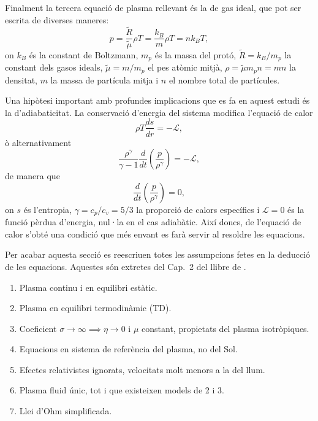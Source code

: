 Finalment la tercera equació de plasma rellevant és la de gas ideal, que pot ser escrita de diverses maneres:
\begin{equation}
	p = \frac{\tilde{R}}{\tilde{\mu}} \rho T = \frac{k_B}{m} \rho T = n k_B T, \tag{2.11} \label{eq.2.11}
\end{equation}
on $k_B$ és la constant de Boltzmann, $m_p$ és la massa del protó, $\tilde{R} = k_B/m_p$ la constant dels gasos ideals, $\tilde{\mu} = m/m_p$ el pes atòmic
mitjà, $\rho = \tilde{\mu} m_p n = m n$ la densitat, $m$ la massa de partícula mitja i $n$ el nombre total de partícules.


Una hipòtesi important amb profundes implicacions que es fa en aquest estudi és la d'adiabaticitat. La conservació d'energia del sistema modifica l'equació de calor
\begin{equation}
	\rho T \frac{ds}{dr} = - \mathcal{L}, \tag{2.12} \label{eq.2.12}
\end{equation}
ò alternativament
\begin{equation}
	\frac{\rho^\gamma}{\gamma - 1} \frac{d}{dt} \left( \frac{p}{\rho^\gamma} \right) = - \mathcal{L}, \tag{2.13} \label{eq.2.13}
\end{equation}
de manera que
\begin{equation}
	\frac{d}{dt} \left( \frac{p}{\rho^\gamma} \right) = 0, \tag{2.14} \label{eq.2.14}
\end{equation}
on $s$ és l'entropia, $\gamma = c_p/c_v = 5/3$ la proporció de calors específics i $\mathcal{L}=0$ és la funció pèrdua d'energia, nul·la en el cas adiabàtic.
Així doncs, de l'equació de calor s'obté una condició que més envant es farà servir al resoldre les equacions.


Per acabar aquesta secció es reescriuen totes les assumpcions fetes en la deducció de les equacions.
Aquestes són extretes del Cap.~2 del llibre de \textcite{Priest_2014}.
\begin{enumerate}[label=\Roman*.]
	\item \label{punt:I} Plasma continu i en equilibri estàtic.
	\item \label{punt:II} Plasma en equilibri termodinàmic (TD).
	\item \label{punt:III} Coeficient $\sigma \rightarrow \infty \implies \eta \rightarrow 0$ i $\mu$ constant, propietats del plasma isotròpiques.
	\item \label{punt:IV} Equacions en sistema de referència del plasma, no del Sol.
	\item \label{punt:V} Efectes relativistes ignorats, velocitats molt menors a la del llum.
	\item \label{punt:VI} Plasma fluid únic, tot i que existeixen models de 2 i 3.
	\item \label{punt:VII} Llei d'Ohm simplificada.
\end{enumerate}